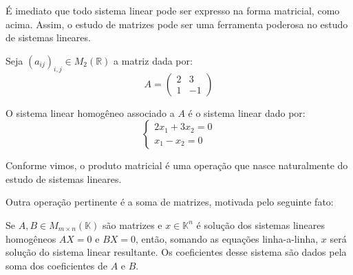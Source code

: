 É imediato que todo sistema linear pode ser expresso na forma matricial, como acima.
Assim, o estudo de matrizes pode ser uma ferramenta poderosa no estudo de sistemas lineares.
\begin{example}
    Seja $(a_{ij})_{i, j}\in M_{2}(\mathbb R)$ a matriz dada por:
    \begin{equation*}
        A = \begin{pmatrix}
            2 & 3 \\
            1 & -1
        \end{pmatrix}
    \end{equation*}

    O sistema linear homogêneo associado a $A$ é o sistema linear dado por:
    \begin{equation*}
        \begin{cases}
            2x_1 + 3x_2 = 0 \\
            x_1 - x_2 = 0
        \end{cases}
    \end{equation*}
\end{example}
Conforme vimos, o produto matricial é uma operação que nasce naturalmente do estudo de sistemas lineares.

Outra operação pertinente é a soma de matrizes, motivada pelo seguinte fato:

Se $A, B \in M_{m \times n}(\mathbb K)$ são matrizes e $x\in \mathbb K^n$ é solução dos sistemas lineares homogêneos $AX=0$ e $BX=0$, então, somando as equações linha-a-linha, $x$ será solução do sistema linear resultante.
Os coeficientes desse sistema são dados pela soma dos coeficientes de $A$ e $B$.

